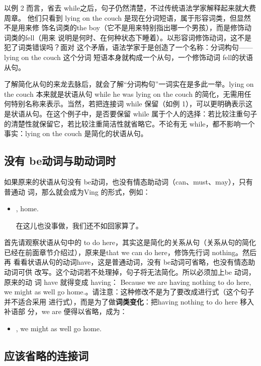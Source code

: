以例 2 而言，省去 while之后，句子仍然清楚，不过传统语法学家解释起来就大费周章。
他们只看到 lying on the couch 是现在分词短语，属于形容词类，但显然不是用来修
饰名词类的the boy（它不是用来特别指出哪一个男孩），而是修饰动词类的fell（用来
说明是何时、在何种状态下睡着）。以形容词修饰动词，这不是犯了词类错误吗？面对
这个矛盾，语法学家于是创造了一个名称：分词构句——lying on the couch 这个分词
短语本身就构成一个从句，一个修饰动词 fell的状语从句。

了解简化从句的来龙去脉后，就会了解“分词构句”一词实在是多此一举。lying
on the couch 本来就是状语从句 while he was lying on the couch
的简化，无需用任何特别名称来表示。当然，若把连接词 while 保留（如例
1），可以更明确表示这是状语从句。在这个例子中，是否要保留 while
属于个人的选择：若比较注重句子的清楚性就保留它，若比较注重简洁性就省略它。不论有无
while，都不影响一个事实：lying on the couch 是简化的状语从句。

\subsection{没有 be动词与助动词时}

如果原来的状语从句没有 be动词，也没有情态助动词（can、must、may），只有普通动
词，那么就会成为Ving 的形式，例如：
\begin{itemize}
\item {}, 
   home.

  在这儿也没事做，我们还不如回家算了。
\end{itemize}
首先请观察状语从句中的 to do here，其实这是简化的关系从句（关系从句的简化
已经在前面章节介绍过），原来是that we can do here，修饰先行词 nothing。然后再
看看状语从句的动词have，这是普通动词，没有 be动词可省略，也没有情态助动词可供
改写。这个动词若不处理掉，句子将无法简化。所以必须加上be 动词，原来的动
词 have 就得变成 having： Because we are having nothing to do here, we might
as well go home.。请注意：这种修改不是为了要改成进行式（这个句子并不适合采用
进行式），而是为了做\textbf{词类变化}：把having nothing to do here 移入补语部
分，we are 便得以省略，成为：
\begin{itemize}
\item {}, we might as well go home.
\end{itemize}

\subsection{应该省略的连接词}

